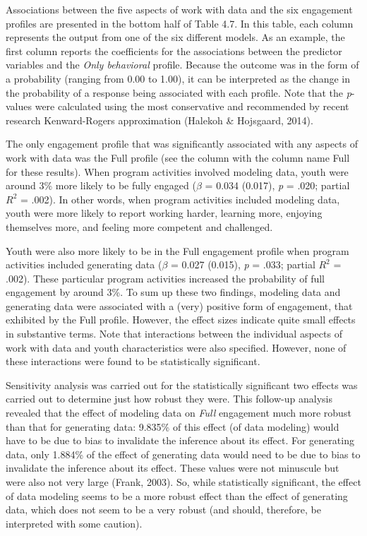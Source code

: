 \documentclass[]{msu-thesis}
\theoremstyle{definition}
\theoremstyle{definition}
\theoremstyle{definition}
\theoremstyle{remark}
\begin{document}
Associations between the five aspects of work with data and the six
engagement profiles are presented in the bottom half of Table 4.7. In
this table, each column represents the output from one of the six
different models. As an example, the first column reports the
coefficients for the associations between the predictor variables and
the \emph{Only behavioral} profile. Because the outcome was in the form
of a probability (ranging from 0.00 to 1.00), it can be interpreted as
the change in the probability of a response being associated with each
profile. Note that the \emph{p}-values were calculated using the most
conservative and recommended by recent research Kenward-Rogers
approximation (Halekoh \& Hojsgaard, 2014).

The only engagement profile that was significantly associated with any
aspects of work with data was the Full profile (see the column with the
column name Full for these results). When program activities involved
modeling data, youth were around 3\% more likely to be fully engaged
(\(\beta\) = 0.034 (0.017), \emph{p} = .020; partial \(R^2\) = .002). In
other words, when program activities included modeling data, youth were
more likely to report working harder, learning more, enjoying themselves
more, and feeling more competent and challenged.

Youth were also more likely to be in the Full engagement profile when
program activities included generating data (\(\beta\) = 0.027 (0.015),
\emph{p} = .033; partial \(R^2\) = .002). These particular program
activities increased the probability of full engagement by around 3\%.
To sum up these two findings, modeling data and generating data were
associated with a (very) positive form of engagement, that exhibited by
the Full profile. However, the effect sizes indicate quite small effects
in substantive terms. Note that interactions between the individual
aspects of work with data and youth characteristics were also specified.
However, none of these interactions were found to be statistically
significant.

Sensitivity analysis was carried out for the statistically significant
two effects was carried out to determine just how robust they were. This
follow-up analysis revealed that the effect of modeling data on
\emph{Full} engagement much more robust than that for generating data:
9.835\% of this effect (of data modeling) would have to be due to bias
to invalidate the inference about its effect. For generating data, only
1.884\% of the effect of generating data would need to be due to bias to
invalidate the inference about its effect. These values were not
minuscule but were also not very large (Frank, 2003). So, while
statistically significant, the effect of data modeling seems to be a
more robust effect than the effect of generating data, which does not
seem to be a very robust (and should, therefore, be interpreted with
some caution).
\end{document}
